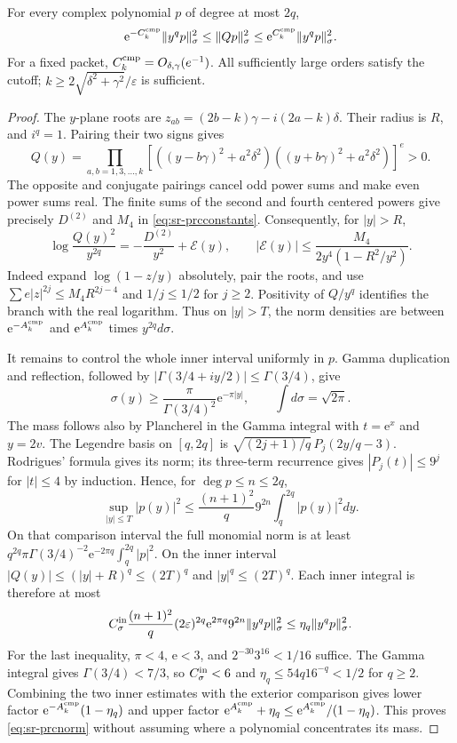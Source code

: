 \begin{lemma}\label{lem:sr-prc}
For every complex polynomial $p$ of degree at most $2q$,
\begin{equation}\label{eq:sr-prcnorm}
 \mathrm e^{-C_k^{\rm cmp}}\|y^qp\|_\sigma^2
 \le\|Qp\|_\sigma^2
 \le \mathrm e^{C_k^{\rm cmp}}\|y^qp\|_\sigma^2.
\end{equation}
For a fixed packet, $C_k^{\rm cmp}=O_{\delta,\gamma}(e^{-1})$. All sufficiently large orders satisfy the cutoff; $k\ge2\sqrt{\delta^2+\gamma^2}/\varepsilon$ is sufficient.
\end{lemma}
\begin{proof}
The $y$-plane roots are $z_{ab}=(2b-k)\gamma-i(2a-k)\delta$. Their radius is $R$, and $i^q=1$. Pairing their two signs gives
\[
 Q(y)=\prod_{a,b=1,3,\ldots,k}
 [((y-b\gamma)^2+a^2\delta^2)((y+b\gamma)^2+a^2\delta^2)]^e>0.
\]
The opposite and conjugate pairings cancel odd power sums and make even power sums real. The finite sums of the second and fourth centered powers give precisely $D^{(2)}$ and $M_4$ in \eqref{eq:sr-prcconstants}. Consequently, for $|y|>R$,
\[
 \log\frac{Q(y)^2}{y^{2q}}
 =-\frac{D^{(2)}}{y^2}+\mathcal E(y),\qquad
 |\mathcal E(y)|\le\frac{M_4}{2y^4(1-R^2/y^2)}.
\]
Indeed expand $\log(1-z/y)$ absolutely, pair the roots, and use
$\sum e|z|^{2j}\le M_4R^{2j-4}$ and $1/j\le1/2$ for $j\ge2$.
Positivity of $Q/y^q$ identifies the branch with the real logarithm. Thus on $|y|>T$, the norm densities are between $\mathrm e^{-A_k^{\rm cmp}}$ and $\mathrm e^{A_k^{\rm cmp}}$ times $y^{2q}d\sigma$.

It remains to control the whole inner interval uniformly in $p$. Gamma duplication and reflection, followed by
$|\Gamma(3/4+iy/2)|\le\Gamma(3/4)$, give
\[
 \sigma(y)\ge\frac{\pi}{\Gamma(3/4)^2}\mathrm e^{-\pi|y|},
 \qquad\int d\sigma=\sqrt{2\pi}.
\]
The mass follows also by Plancherel in the Gamma integral with $t=\mathrm e^x$ and $y=2v$.
The Legendre basis on $[q,2q]$ is
$\sqrt{(2j+1)/q}\,P_j(2y/q-3)$. Rodrigues' formula gives its norm; its three-term recurrence gives $|P_j(t)|\le9^j$ for $|t|\le4$ by induction. Hence, for $\deg p\le n\le2q$,
\[
 \sup_{|y|\le T}|p(y)|^2\le\frac{(n+1)^2}{q}9^{2n}
                         \int_q^{2q}|p(y)|^2dy.
\]
On that comparison interval the full monomial norm is at least
$q^{2q}\pi\Gamma(3/4)^{-2}\mathrm e^{-2\pi q}\int_q^{2q}|p|^2$.
On the inner interval $|Q(y)|\le(|y|+R)^q\le(2T)^q$ and $|y|^q\le(2T)^q$. Each inner integral is therefore at most
\[
 C_\sigma^{\rm in}\frac{(n+1)^2}{q}
 (2\varepsilon)^{2q}\mathrm e^{2\pi q}9^{2n}\|y^qp\|_\sigma^2
 \le\eta_q\|y^qp\|_\sigma^2.
\]
For the last inequality, $\pi<4$, $\mathrm e<3$, and
$2^{-30}3^{16}<1/16$ suffice. The Gamma integral gives
$\Gamma(3/4)<7/3$, so $C_\sigma^{\rm in}<6$ and
$\eta_q\le54q16^{-q}<1/2$ for $q\ge2$.
Combining the two inner estimates with the exterior comparison gives lower factor $\mathrm e^{-A_k^{\rm cmp}}(1-\eta_q)$ and upper factor $\mathrm e^{A_k^{\rm cmp}}+\eta_q\le \mathrm e^{A_k^{\rm cmp}}/(1-\eta_q)$. This proves \eqref{eq:sr-prcnorm} without assuming where a polynomial concentrates its mass.


\end{proof}
